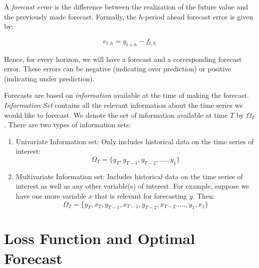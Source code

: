 \documentclass[]{book}
\theoremstyle{definition}
\theoremstyle{definition}
\theoremstyle{definition}
\theoremstyle{remark}
\let\BeginKnitrBlock\begin \let\EndKnitrBlock\end
\begin{document}
\BeginKnitrBlock{definition}[Forecast Error]
\protect\hypertarget{def:d3}{}{\label{def:d3} {} }
\EndKnitrBlock{definition}

A \emph{forecast error} is the difference between the realization of the
future value and the previously made forecast. Formally, the
\(h\)-period ahead forecast error is given by:

\begin{equation}
e_{t,h}=y_{t+h}-f_{t,h}
\end{equation}

Hence, for every horizon, we will have a forecast and a corresponding
forecast error. These errors can be negative (indicating over
prediction) or positive (indicating under prediction).

\BeginKnitrBlock{definition}[Information Set]
\protect\hypertarget{def:d4}{}{\label{def:d4} {} }
\EndKnitrBlock{definition}

Forecasts are based on \emph{information} available at the time of
making the forecast. \emph{Information Set} contains all the relevant
information about the time series we would like to forecast. We denote
the set of information available at time \(T\) by \(\Omega_T\). There
are two types of information sets:

\begin{enumerate}
\def\labelenumi{\arabic{enumi}.}
\item
  Univariate Information set: Only includes historical data on the time
  series of interest: \begin{equation}
  \Omega_T=\{y_T, y_{T-1}, y_{T-2}, ...., y_1\}
  \end{equation}
\item
  Multivariate Information set: Includes historical data on the time
  series of interest as well as any other variable(s) of interest. For
  example, suppose we have one more variable \(x\) that is relevant for
  forecasting \(y\). Then: \begin{equation}
  \Omega_T=\{y_T, x_T, y_{T-1}, x_{T-1}, y_{T-2},x_{T-2}. ...., y_1, x_1\}
  \end{equation}
\end{enumerate}

\hypertarget{loss-function-and-optimal-forecast}{%
\section{Loss Function and Optimal
Forecast}\label{loss-function-and-optimal-forecast}}
\end{document}
